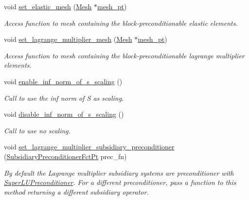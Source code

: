 \begin{DoxyCompactItemize}
void \hyperlink{classoomph_1_1PseudoElasticPreconditioner_ae115b58574a36c2c8fecb2524afa54f1}{set\+\_\+elastic\+\_\+mesh} (\hyperlink{classoomph_1_1Mesh}{Mesh} $\ast$\hyperlink{classoomph_1_1BlockPreconditioner_a3c0e92cb77c3e3179007fe9fd99b6428}{mesh\+\_\+pt})
\begin{DoxyCompactList}\small\item\em Access function to mesh containing the block-\/preconditionable elastic elements. \end{DoxyCompactList}\item 
void \hyperlink{classoomph_1_1PseudoElasticPreconditioner_a6030c2461383ee1a0b8ac6ed56b0daf6}{set\+\_\+lagrange\+\_\+multiplier\+\_\+mesh} (\hyperlink{classoomph_1_1Mesh}{Mesh} $\ast$\hyperlink{classoomph_1_1BlockPreconditioner_a3c0e92cb77c3e3179007fe9fd99b6428}{mesh\+\_\+pt})
\begin{DoxyCompactList}\small\item\em Access function to mesh containing the block-\/preconditionable lagrange multiplier elements. \end{DoxyCompactList}\item 
void \hyperlink{classoomph_1_1PseudoElasticPreconditioner_a917caf20e03fc8bdb45336206ce5365e}{enable\+\_\+inf\+\_\+norm\+\_\+of\+\_\+s\+\_\+scaling} ()
\begin{DoxyCompactList}\small\item\em Call to use the inf norm of S as scaling. \end{DoxyCompactList}\item 
void \hyperlink{classoomph_1_1PseudoElasticPreconditioner_a038e7d2eaea4346c3ea6ba2b34ae824c}{disable\+\_\+inf\+\_\+norm\+\_\+of\+\_\+s\+\_\+scaling} ()
\begin{DoxyCompactList}\small\item\em Call to use no scaling. \end{DoxyCompactList}\item 
void \hyperlink{classoomph_1_1PseudoElasticPreconditioner_a64865a85f35ae9385f9f8d68e75595e0}{set\+\_\+lagrange\+\_\+multiplier\+\_\+subsidiary\+\_\+preconditioner} (\hyperlink{classoomph_1_1PseudoElasticPreconditioner_a1462e1ef48ed2668c06dfd36c783d1a5}{Subsidiary\+Preconditioner\+Fct\+Pt} prec\+\_\+fn)
\begin{DoxyCompactList}\small\item\em By default the Lagrange multiplier subsidiary systems are preconditioner with \hyperlink{classoomph_1_1SuperLUPreconditioner}{Super\+L\+U\+Preconditioner}. For a different preconditioner, pass a function to this method returning a different subsidiary operator. \end{DoxyCompactList}\item 

\end{DoxyCompactItemize}
